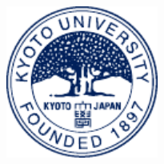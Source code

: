 \begin{titlepage}
  
  
  
  
  \includegraphics[width=5cm, keepaspectratio]{figs/logo.pdf}\\[1cm] %
   
  
  \vfill %
  
  \end{titlepage}